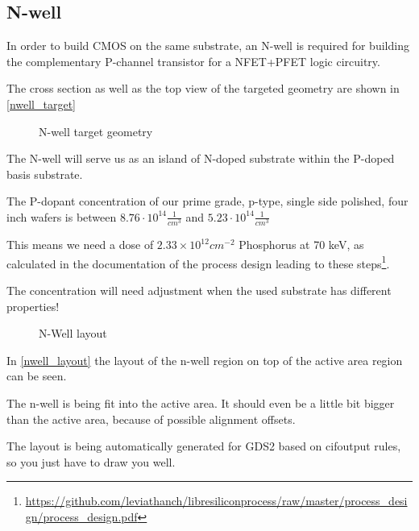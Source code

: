 \subsection{N-well}\label{nwell_chapter}
In order to build CMOS on the same substrate, an N-well is required for building the complementary P-channel transistor for a NFET+PFET logic circuitry.

The cross section as well as the top view of the targeted geometry are shown in \autoref{nwell_target}

\begin{figure}[H]
	\centering
	\begin{tikzpicture}[node distance = 3cm, auto, thick,scale=\CrossAndTopSectionBig, every node/.style={transform shape}]
		
	\end{tikzpicture}
	\begin{tikzpicture}[node distance = 3cm, auto, thick,scale=\CrossAndTopSectionBig, every node/.style={transform shape}]
		
	\end{tikzpicture}
	\caption{N-well target geometry}
	\label{nwell_target}
\end{figure}

The N-well will serve us as an island of N-doped substrate within the P-doped basis substrate.

The P-dopant concentration of our prime grade, p-type, single side polished, four inch wafers is between $8.76 \cdot 10^14 \frac{1}{cm^3}$ and $5.23 \cdot 10^14 \frac{1}{cm^3}$

This means we need a dose of $2.33\times10^{12}cm^{-2}$ Phosphorus at 70 keV, as calculated in the documentation of the process design leading to these steps\footnote{\url{https://github.com/leviathanch/libresiliconprocess/raw/master/process_design/process_design.pdf}}.

The concentration will need adjustment when the used substrate has different properties!

\begin{figure}[H]
	\centering
	\begin{tikzpicture}[node distance =1cm, auto, thick,scale=\VLSILayout, every node/.style={transform shape}]
		
	\end{tikzpicture}
	\caption{N-Well layout}
	\label{nwell_layout}
\end{figure}

In \autoref{nwell_layout} the layout of the n-well region on top of the active area region can be seen.

The n-well is being fit into the active area. It should even be a little bit bigger than the active area, because of possible alignment offsets.

The layout is being automatically generated for GDS2 based on cifoutput rules, so you just have to draw you well.


